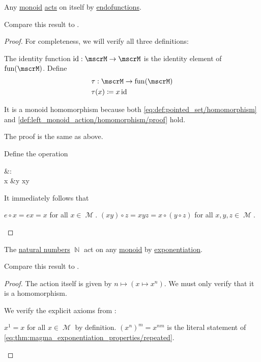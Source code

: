 \begin{proposition}\label{thm:monoid_is_action}
  Any \hyperref[def:unital_magma/associative]{monoid} \hyperref[def:left_monoid_action]{acts} on itself by \hyperref[def:endofunction]{endofunctions}.

  Compare this result to .
\end{proposition}
\begin{proof}
  For completeness, we will verify all three definitions:

   The identity function \( \id: \mscrM \to \mscrM \) is the identity element of \( \fun(\mscrM) \). Define
  \begin{align*}
    &\tau: \mscrM \to \fun(\mscrM) \\
    &\tau(x) \coloneqq x \id
  \end{align*}

  It is a monoid homomorphism because both \eqref{eq:def:pointed_set/homomorphism} and \eqref{def:left_monoid_action/homomorphism/proof} hold.

   The proof is the same as above.

   Define the operation
  \begin{balign*}
    {}&\odot{}: \mscrM \times \mscrM \to \mscrM \\
    x &\odot y \coloneqq xy
  \end{balign*}

  It immediately follows that
  \begin{reflist}
     \( e \circ x = ex = x \) for all \( x \in \mscrM \).
     \( (x y) \circ z = xyz = x \circ (y \circ z) \) for all \( x, y, z \in \mscrM \).
  \end{reflist}
\end{proof}

\begin{proposition}\label{thm:natural_numbers_monoid_action}
  The \hyperref[def:natural_numbers]{natural numbers} \( \BbbN \) act on any \hyperref[def:unital_magma/associative]{monoid} by \hyperref[def:unital_magma/exponentiation]{exponentiation}.

  Compare this result to .
\end{proposition}
\begin{proof}
  The action itself is given by \( n \mapsto (x \mapsto x^n) \). We must only verify that it is a homomorphism.

  We verify the explicit axioms from :
  \begin{reflist}
     \( x^1 = x \) for all \( x \in \mscrM \) by definition.
     \( (x^n)^m = x^{nm} \) is the literal statement of \eqref{eq:thm:magma_exponentiation_properties/repeated}.
  \end{reflist}
\end{proof}
